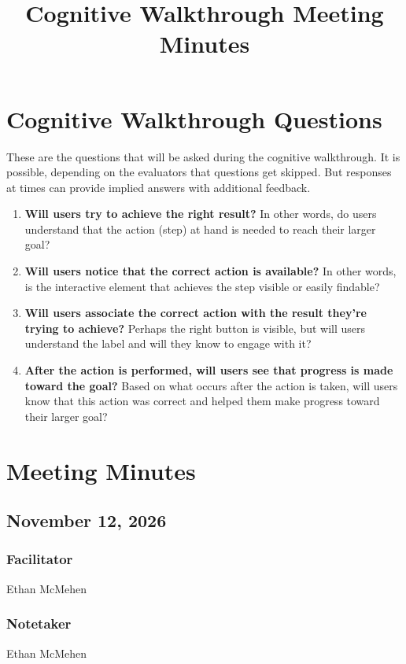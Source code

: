 \documentclass{article}
\title{\progname Cognitive Walkthrough Meeting Minutes}
\author{\authname}
\date{}
\begin{document}
\maketitle
\section{Cognitive Walkthrough Questions}
These are the questions that will be asked during the cognitive walkthrough. It is possible, 
depending on the evaluators that questions get skipped. But responses at times can provide
implied answers with additional feedback.

\begin{enumerate}
    \item \textbf{Will users try to achieve the right result?} 
    In other words, do users understand that the action (step) at hand is needed to reach their larger goal?
    \item \textbf{Will users notice that the correct action is available?} 
    In other words, is the interactive element that achieves the step visible or easily findable?
    \item \textbf{Will users associate the correct action with the result they’re trying to achieve?} 
    Perhaps the right button is visible, but will users understand the label and will they know to engage with it?
    \item \textbf{After the action is performed, will users see that progress is made toward the goal?} 
    Based on what occurs after the action is taken, will users know that this action was correct and 
    helped them make progress toward their larger goal?
\end{enumerate}

\newpage

\section{Meeting Minutes}

\subsection{November 12, 2026}
\subsubsection*{Facilitator}
Ethan McMehen
\subsubsection*{Notetaker}
Ethan McMehen
\end{document}
